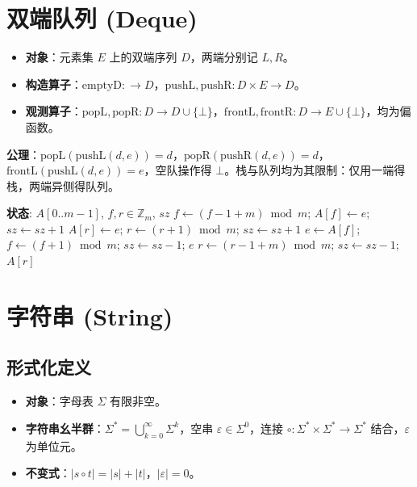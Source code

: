 \section{双端队列 (Deque)}

\begin{itemize}
    \item \textbf{对象}：元素集 $E$ 上的双端序列 $D$，两端分别记 $L, R$。
    \item \textbf{构造算子}：$\text{emptyD}: \to D$，$\text{pushL}, \text{pushR}: D \times E \to D$。
    \item \textbf{观测算子}：$\text{popL}, \text{popR}: D \to D \cup \{\bot\}$，$\text{frontL}, \text{frontR}: D \to E \cup \{\bot\}$，均为偏函数。
\end{itemize}

\textbf{公理}：$\text{popL}(\text{pushL}(d,e)) = d$，$\text{popR}(\text{pushR}(d,e)) = d$，$\text{frontL}(\text{pushL}(d,e)) = e$，空队操作得 $\bot$。栈与队列均为其限制：仅用一端得栈，两端异侧得队列。

\begin{algorithm}[H]
\caption{双端队列规约（循环数组实现）}
\begin{algorithmic}[1]
\State \textbf{状态}: $A[0..m-1]$, $f,r\in\mathbb{Z}_m$, $sz$
 
    \State $f\gets(f-1+m)\bmod m$; $A[f]\gets e$; $sz\gets sz+1$
\EndProcedure
{} 
    \State $A[r]\gets e$; $r\gets(r+1)\bmod m$; $sz\gets sz+1$
\EndProcedure
{} 
    \State $e\gets A[f]$; $f\gets(f+1)\bmod m$; $sz\gets sz-1$; \Return $e$
\EndProcedure
{} 
    \State $r\gets(r-1+m)\bmod m$; $sz\gets sz-1$; \Return $A[r]$
\EndProcedure
\end{algorithmic}
\end{algorithm}

\section{字符串 (String)}

\subsection{形式化定义}
\begin{itemize}
    \item \textbf{对象}：字母表 $\Sigma$ 有限非空。
    \item \textbf{字符串幺半群}：$\Sigma^* = \bigcup_{k=0}^{\infty} \Sigma^k$，空串 $\varepsilon\in\Sigma^0$，连接 $\circ: \Sigma^*\times\Sigma^*\to\Sigma^*$ 结合，$\varepsilon$ 为单位元。
    \item \textbf{不变式}：$|s\circ t| = |s|+|t|$，$|\varepsilon|=0$。
\end{itemize}

